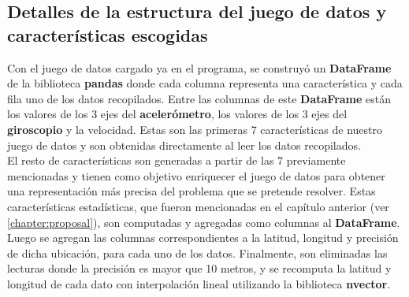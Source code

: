 	\subsection{Detalles de la estructura del juego de datos y características escogidas}
		Con el juego de datos cargado ya en el programa, se construyó un \textbf{DataFrame} de la biblioteca \textbf{pandas} donde cada columna representa
		una característica y cada fila uno de los datos recopilados. Entre las columnas de este \textbf{DataFrame} están los valores de los 3 ejes del \textbf
		{acelerómetro}, los valores de los 3 ejes del \textbf{giroscopio} y la velocidad. Estas son las primeras 7 características de nuestro juego de datos
		y son obtenidas directamente al leer los datos recopilados.\\
		\indent El resto de características son generadas a partir de las 7 previamente mencionadas y tienen como objetivo
		enriquecer el juego de datos para obtener una representación más precisa del problema que se pretende resolver. Estas características estadísticas,
		que fueron mencionadas en el capítulo anterior (ver \ref{chapter:proposal}), son computadas y agregadas como columnas al \textbf{DataFrame}.
		Luego se agregan las columnas correspondientes a la latitud, longitud y precisión de dicha ubicación, para cada uno de los datos. Finalmente, son
		eliminadas las lecturas donde la precisión es mayor que 10 metros, y se recomputa la latitud y longitud de cada dato con interpolación lineal
		utilizando la biblioteca \textbf{nvector}.

